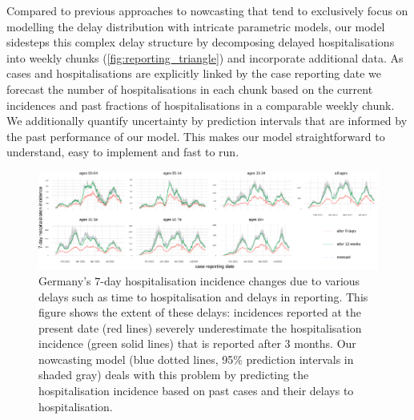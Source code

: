 Compared to previous approaches to nowcasting that tend to exclusively
focus on modelling the delay distribution with intricate parametric
models, our model sidesteps this complex delay structure by decomposing
delayed hospitalisations into weekly chunks (\cref{fig:reporting_triangle}) and incorporate additional data. As cases
and hospitalisations are explicitly linked by the case reporting date we
forecast the number of hospitalisations in each chunk based on the
current incidences and past fractions of hospitalisations in a
comparable weekly chunk. We additionally quantify uncertainty by
prediction intervals that are informed by the past performance of our
model. This makes our model straightforward to understand, easy to
implement and fast to run.

\begin{figure}

{\centering \includegraphics[width=\textwidth]{figures_tentative/delays_in_reporting-1} 

}

\caption{Germany's $7$-day hospitalisation incidence changes due to various delays such as time to hospitalisation and delays in reporting. This figure shows the extent of these delays: incidences reported at the present date (red lines) severely underestimate the hospitalisation incidence (green solid lines) that is reported after $3$ months. Our nowcasting model (blue dotted lines, 95\% prediction intervals in shaded gray) deals with this problem by predicting the hospitalisation incidence based on past cases and their delays to hospitalisation.}\label{fig:delays_in_reporting}
\end{figure}


